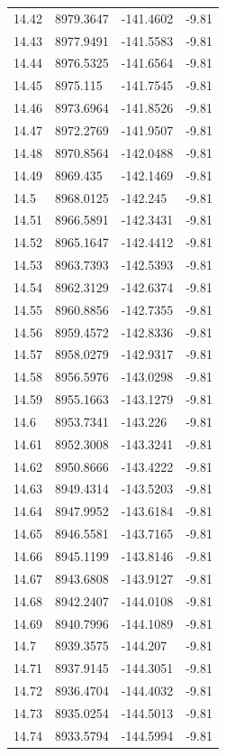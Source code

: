 \begin{table}[H]
\begin{tabular}{llll}
14.42 & 8979.3647 & -141.4602 & -9.81 \\
14.43 & 8977.9491 & -141.5583 & -9.81 \\
14.44 & 8976.5325 & -141.6564 & -9.81 \\
14.45 & 8975.115 & -141.7545 & -9.81 \\
14.46 & 8973.6964 & -141.8526 & -9.81 \\
14.47 & 8972.2769 & -141.9507 & -9.81 \\
14.48 & 8970.8564 & -142.0488 & -9.81 \\
14.49 & 8969.435 & -142.1469 & -9.81 \\
14.5 & 8968.0125 & -142.245 & -9.81 \\
14.51 & 8966.5891 & -142.3431 & -9.81 \\
14.52 & 8965.1647 & -142.4412 & -9.81 \\
14.53 & 8963.7393 & -142.5393 & -9.81 \\
14.54 & 8962.3129 & -142.6374 & -9.81 \\
14.55 & 8960.8856 & -142.7355 & -9.81 \\
14.56 & 8959.4572 & -142.8336 & -9.81 \\
14.57 & 8958.0279 & -142.9317 & -9.81 \\
14.58 & 8956.5976 & -143.0298 & -9.81 \\
14.59 & 8955.1663 & -143.1279 & -9.81 \\
14.6 & 8953.7341 & -143.226 & -9.81 \\
14.61 & 8952.3008 & -143.3241 & -9.81 \\
14.62 & 8950.8666 & -143.4222 & -9.81 \\
14.63 & 8949.4314 & -143.5203 & -9.81 \\
14.64 & 8947.9952 & -143.6184 & -9.81 \\
14.65 & 8946.5581 & -143.7165 & -9.81 \\
14.66 & 8945.1199 & -143.8146 & -9.81 \\
14.67 & 8943.6808 & -143.9127 & -9.81 \\
14.68 & 8942.2407 & -144.0108 & -9.81 \\
14.69 & 8940.7996 & -144.1089 & -9.81 \\
14.7 & 8939.3575 & -144.207 & -9.81 \\
14.71 & 8937.9145 & -144.3051 & -9.81 \\
14.72 & 8936.4704 & -144.4032 & -9.81 \\
14.73 & 8935.0254 & -144.5013 & -9.81 \\
14.74 & 8933.5794 & -144.5994 & -9.81 \\

\end{tabular}
\end{table}
